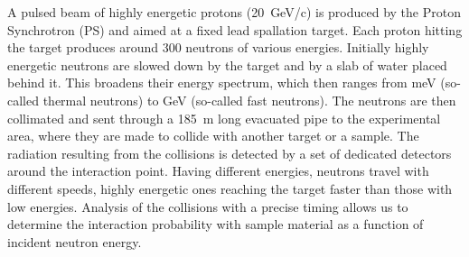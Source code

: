 \documentclass[twoside,12pt]{packages/mytustyle}  %
\begin{document}
A pulsed beam of highly energetic protons (20~GeV/c) is produced by the Proton Synchrotron (PS) and aimed at a fixed lead spallation target. Each proton hitting the target produces around 300 neutrons of various energies. Initially highly energetic neutrons are slowed down by the target and by a slab of water placed behind it. This broadens their energy spectrum, which then ranges from meV (so-called thermal neutrons) to GeV (so-called fast neutrons). The neutrons are then collimated and sent through a 185~m long evacuated pipe to the experimental area, where they are made to collide with another target or a sample. The radiation resulting from the collisions is detected by a set of dedicated detectors around the interaction point. Having different energies, neutrons travel with different speeds, highly energetic ones reaching the target faster than those with low energies. Analysis of the collisions with a precise timing allows us to determine the interaction probability with sample material as a function of incident neutron energy.




%


\end{document}
